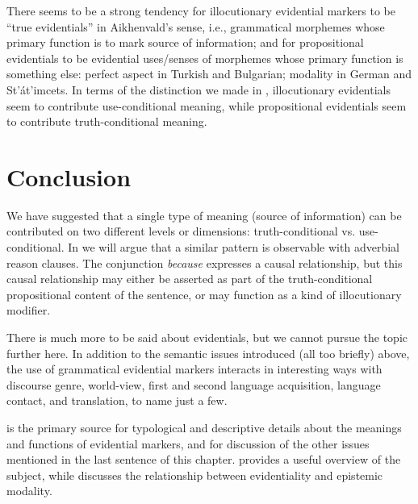 There seems to be a strong tendency for illocutionary evidential markers to be “true evidentials” in Aikhenvald’s sense, i.e., grammatical morphemes whose primary function is to mark source of information; and for propositional evidentials to be evidential uses/senses of morphemes whose primary function is something else: perfect aspect in Turkish and Bulgarian; modality in German and St’át’imcets. In terms of the distinction we made in , illocutionary evidentials seem to contribute use-conditional meaning, while propositional evidentials seem to contribute truth-conditional meaning.


\section{Conclusion}\label{sec:17.6}

We have suggested that a single type of meaning (source of information) can be contributed on two different levels or dimensions: truth-conditional vs. use-conditional. In  we will argue that a similar pattern is observable with adverbial reason clauses. The conjunction \textit{because} expresses a causal relationship, but this causal relationship may either be asserted as part of the truth-conditional propositional content of the sentence, or may function as a kind of illocutionary modifier.



There is much more to be said about evidentials, but we cannot pursue the topic further here. In addition to the semantic issues introduced (all too briefly) above, the use of grammatical evidential markers interacts in interesting ways with discourse genre, world-view, first and second language acquisition, language contact, and translation, to name just a few.



\furtherreading



\citet{Aikhenvald2004} is the primary source for typological and descriptive details about the meanings and functions of evidential markers, and for discussion of the other issues mentioned in the last sentence of this chapter.  provides a useful overview of the subject, while   \citet{deHaan1999,deHaan2005} discusses the relationship between evidentiality and epistemic modality.